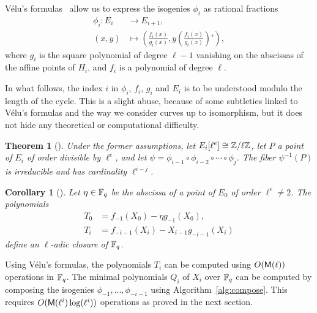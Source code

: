 \documentclass{sig-alternate}
\newtheorem{theorem}[definition]{Theorem}
\newtheorem{corollary}[definition]{Corollary}
\begin{document}
Vélu's formulas~\cite{velu71} allow us to express the isogenies
$\phi_i$ as rational fractions
\begin{equation}
  \begin{aligned}
    \phi_i: E_i &\to E_{i+1},\\
    (x,y) &\mapsto \left(\frac{f_i(x)}{g_i(x)}, y\left(\frac{f_i(x)}{g_i(x)}\right)'\right),
  \end{aligned}
\end{equation}
where $g_i$ is the square polynomial of degree $\ell-1$ vanishing on
the abscissas of the affine points of $H_i$, and $f_i$ is a polynomial
of degree $\ell$.

In what follows, the index $i$ in $\phi_i$, $f_i$, $g_i$ and $E_i$ is
to be understood modulo the length of the cycle. This is a slight
abuse, because of some subtleties linked to Vélu's formulas and the
way we consider curves up to isomorphism, but it does not hide any
theoretical or computational difficulty.  

\begin{theorem}[{\cite[Section~4]{couveignes+lercier11}}]
  Under the former assumptions, let $E_i[\ell^e]\cong\mathbb{Z}/\ell\mathbb{Z}$,
  let $P$ a point of $E_i$ of order divisible by $\ell^e$, and let
  $\psi=\phi_{i-1}\circ\phi_{i-2}\circ\cdots\circ\phi_{j}$. The fiber
  $\psi^{-1}(P)$ is irreducible and has cardinality $\ell^{i-j}$.
\end{theorem}

\begin{corollary}[{\cite[Section~4]{couveignes+lercier11}}]
  Let $\eta\in\mathbb{F}_q$ be the abscissa of a point of $E_0$ of order
  $\ell^e\ne 2$. The polynomials
  \begin{align*}
    T_0 &= f_{-1}(X_0) - \eta g_{-1}(X_0),\\
    T_i &= f_{-i-1}(X_i) - X_{i-1} g_{-i-1}(X_i)
  \end{align*}
  define an $\ell$-adic closure of $\mathbb{F}_q$.
\end{corollary}

Using Vélu's formulas, the polynomials $T_i$ can be computed using
$O(\mathsf{M}(\ell))$ operations in $\mathbb{F}_q$. The minimal polynomials $Q_i$
of $X_i$ over $\mathbb{F}_q$ can be computed by composing the isogenies
$\phi_{-1},\dots,\phi_{-i-1}$ using Algorithm~\ref{alg:compose}. This
requires $O(\mathsf{M}(\ell^i)\log(\ell^i))$ operations as proved in the
next section.
\end{document}
